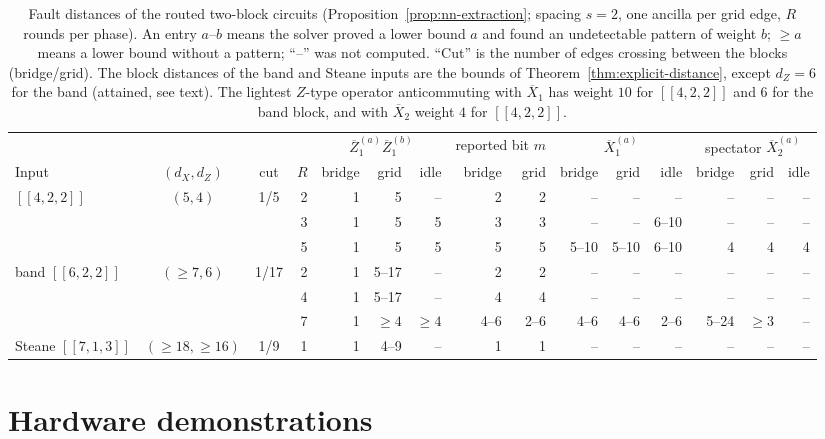 \documentclass[aps,prx,reprint,superscriptaddress,nofootinbib,floatfix,longbibliography]{revtex4-2}
\theoremstyle{definition}
\begin{document}
\begin{table}[t]
\caption{Fault distances of the routed two-block circuits
(Proposition~\ref{prop:nn-extraction}; spacing $s=2$, one ancilla per grid
edge, $R$ rounds per phase).  An entry $a$--$b$ means the solver proved a
lower bound $a$ and found an undetectable pattern of weight $b$; ${\ge}a$
means a lower bound without a pattern; ``--'' was not computed.  ``Cut'' is
the number of edges crossing between the blocks (bridge/grid).  The block
distances of the band and Steane inputs are the bounds of
Theorem~\ref{thm:explicit-distance}, except $d_Z=6$ for the band (attained,
see text).  The lightest $Z$-type operator anticommuting with
$\overline X_1$ has weight $10$ for $[[4,2,2]]$ and $6$ for the band block,
and with $\overline X_2$ weight $4$ for $[[4,2,2]]$.}
\label{tab:two-block-routed}
\centering
\scriptsize
\setlength{\tabcolsep}{3.2pt}
\begin{tabular}{@{}lccrrrrrrrrrrrr@{}}
\toprule
 & & & & \multicolumn{3}{c}{$\overline Z_1^{(a)}\overline Z_1^{(b)}$} & \multicolumn{2}{c}{reported bit $m$} & \multicolumn{3}{c}{$\overline X_1^{(a)}$} & \multicolumn{3}{c}{spectator $\overline X_2^{(a)}$} \\
\cmidrule(lr){5-7}\cmidrule(lr){8-9}\cmidrule(lr){10-12}\cmidrule(l){13-15}
Input & $(d_X,d_Z)$ & cut & $R$ & bridge & grid & idle & bridge & grid & bridge & grid & idle & bridge & grid & idle \\
\midrule
$[[4,2,2]]$ & $(5,4)$ & 1/5 & 2 & 1 & 5 & -- & 2 & 2 & -- & -- & -- & -- & -- & -- \\
 & & & 3 & 1 & 5 & 5 & 3 & 3 & -- & -- & 6--10 & -- & -- & -- \\
 & & & 5 & 1 & 5 & 5 & 5 & 5 & 5--10 & 5--10 & 6--10 & 4 & 4 & 4 \\
\addlinespace[2pt]
band $[[6,2,2]]$ & $({\ge}7,6)$ & 1/17 & 2 & 1 & 5--17 & -- & 2 & 2 & -- & -- & -- & -- & -- & -- \\
 & & & 4 & 1 & 5--17 & -- & 4 & 4 & -- & -- & -- & -- & -- & -- \\
 & & & 7 & 1 & ${\ge}4$ & ${\ge}4$ & 4--6 & 2--6 & 4--6 & 4--6 & 2--6 & 5--24 & ${\ge}3$ & -- \\
\addlinespace[2pt]
Steane $[[7,1,3]]$ & $({\ge}18,{\ge}16)$ & 1/9 & 1 & 1 & 4--9 & -- & 1 & 1 & -- & -- & -- & -- & -- & -- \\
\bottomrule
\end{tabular}
\end{table}


\section{Hardware demonstrations}
\label{sec:hardware}
\end{document}
